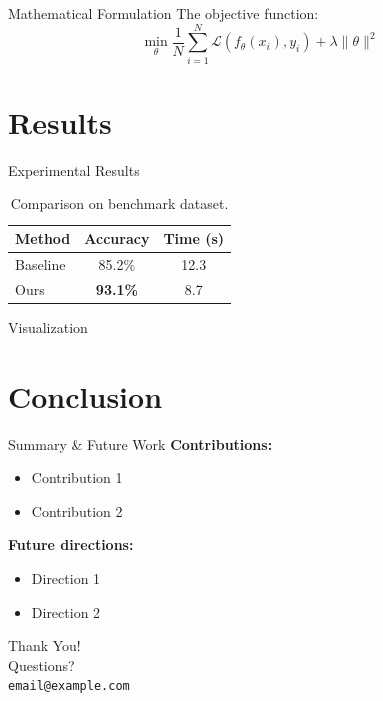 \documentclass[aspectratio=169, 11pt]{beamer}
\begin{document}
\begin{frame}{Mathematical Formulation}
    The objective function:
    \[
        \min_{\theta} \frac{1}{N} \sum_{i=1}^{N} \mathcal{L}(f_\theta(x_i), y_i) + \lambda \|\theta\|^2
    \]
\end{frame}

\section{Results}

\begin{frame}{Experimental Results}
    \begin{table}
        \centering
        \begin{tabular}{lcc}
            \toprule
            Method & Accuracy & Time (s) \\
            \midrule
            Baseline & 85.2\% & 12.3 \\
            Ours & \textbf{93.1\%} & 8.7 \\
            \bottomrule
        \end{tabular}
        \caption{Comparison on benchmark dataset.}
    \end{table}
\end{frame}

\begin{frame}{Visualization}
    \centering
\end{frame}

\section{Conclusion}

\begin{frame}{Summary \& Future Work}
    \textbf{Contributions:}
    \begin{itemize}
        \item Contribution 1
        \item Contribution 2
    \end{itemize}
    \vspace{1em}
    \textbf{Future directions:}
    \begin{itemize}
        \item Direction 1
        \item Direction 2
    \end{itemize}
\end{frame}

\begin{frame}
    \centering
    \Huge Thank You! \\ \vspace{1em}
    \normalsize Questions? \\ \vspace{0.5em}
    \texttt{email@example.com}
\end{frame}
\end{document}
